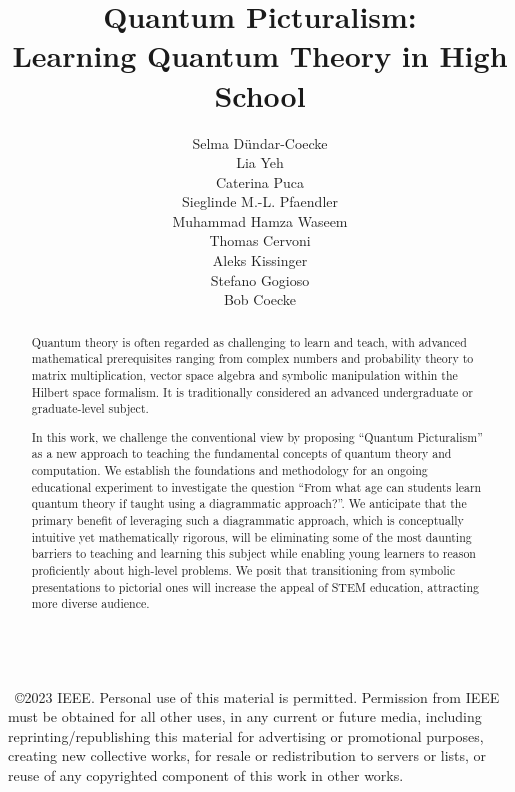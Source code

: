 \documentclass[12pt]{article}
\begin{document}
\title{Quantum Picturalism:\\Learning Quantum Theory in High School}

\author{Selma D\"undar-Coecke \\ Lia Yeh \\ Caterina Puca \\Sieglinde M.-L. Pfaendler \\
Muhammad Hamza Waseem\\
    Thomas Cervoni\\
    Aleks Kissinger\\
    Stefano Gogioso\\
    Bob Coecke}
    
\maketitle

\begin{abstract}
Quantum theory is often regarded as challenging to learn and teach, with advanced mathematical prerequisites ranging from complex numbers and probability theory to matrix multiplication, vector space algebra and symbolic manipulation within the Hilbert space formalism. It is traditionally considered an advanced undergraduate or graduate-level subject.

In this work, we challenge the conventional view by proposing “Quantum Picturalism” as a new approach to teaching the fundamental concepts of quantum theory and computation. We establish the foundations and methodology for an ongoing educational experiment to investigate the question “From what age can students learn quantum theory if taught using a diagrammatic approach?”.
We anticipate that the primary benefit of leveraging such a diagrammatic approach, which is conceptually intuitive yet mathematically rigorous, will be eliminating some of the most daunting barriers to teaching and learning this subject while enabling young learners to reason proficiently about high-level problems.
We posit that transitioning from symbolic presentations to pictorial ones will increase the appeal of STEM education, attracting more diverse audience.

\end{abstract}
{\begin{minipage}{\textwidth}\ \\[12pt]\ \copyright2023 IEEE. Personal use of this material is permitted. Permission from IEEE must be obtained for all other uses, in any current or future media, including reprinting/republishing this material for advertising or promotional purposes, creating new collective works, for resale or redistribution to servers or lists, or reuse of any copyrighted component of this work in other works.\hfill \end{minipage}}

\newpage







\clearpage


\end{document}
